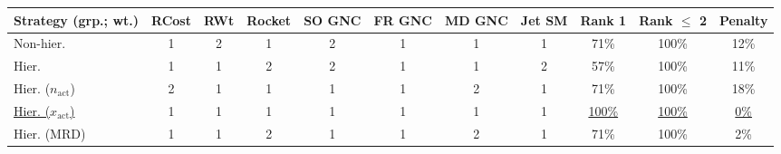\begin{tabular}{lcccccccccc}
\toprule
Strategy (grp.; wt.) & RCost & RWt & Rocket & SO GNC & FR GNC & MD GNC & Jet SM & Rank 1 & Rank $\leq$ 2 & Penalty \\
\midrule
Non-hier. & {\cellcolor[HTML]{00441B}} \color[HTML]{F1F1F1} 1 & {\cellcolor[HTML]{F7FCF5}} \color[HTML]{000000} 2 & {\cellcolor[HTML]{00441B}} \color[HTML]{F1F1F1} 1 & {\cellcolor[HTML]{F7FCF5}} \color[HTML]{000000} 2 & {\cellcolor[HTML]{00441B}} \color[HTML]{F1F1F1} 1 & {\cellcolor[HTML]{00441B}} \color[HTML]{F1F1F1} 1 & {\cellcolor[HTML]{00441B}} \color[HTML]{F1F1F1} 1 & {\cellcolor[HTML]{2B7BBA}} \color[HTML]{F1F1F1} 71\% & {\cellcolor[HTML]{08306B}} \color[HTML]{F1F1F1} 100\% & {\cellcolor[HTML]{94D390}} \color[HTML]{000000} 12\% \\
Hier. & {\cellcolor[HTML]{00441B}} \color[HTML]{F1F1F1} 1 & {\cellcolor[HTML]{00441B}} \color[HTML]{F1F1F1} 1 & {\cellcolor[HTML]{F7FCF5}} \color[HTML]{000000} 2 & {\cellcolor[HTML]{F7FCF5}} \color[HTML]{000000} 2 & {\cellcolor[HTML]{00441B}} \color[HTML]{F1F1F1} 1 & {\cellcolor[HTML]{00441B}} \color[HTML]{F1F1F1} 1 & {\cellcolor[HTML]{F7FCF5}} \color[HTML]{000000} 2 & {\cellcolor[HTML]{539ECD}} \color[HTML]{F1F1F1} 57\% & {\cellcolor[HTML]{08306B}} \color[HTML]{F1F1F1} 100\% & {\cellcolor[HTML]{86CC85}} \color[HTML]{000000} 11\% \\
Hier. ($n_{\mathrm{act}}$) & {\cellcolor[HTML]{F7FCF5}} \color[HTML]{000000} 2 & {\cellcolor[HTML]{00441B}} \color[HTML]{F1F1F1} 1 & {\cellcolor[HTML]{00441B}} \color[HTML]{F1F1F1} 1 & {\cellcolor[HTML]{00441B}} \color[HTML]{F1F1F1} 1 & {\cellcolor[HTML]{00441B}} \color[HTML]{F1F1F1} 1 & {\cellcolor[HTML]{F7FCF5}} \color[HTML]{000000} 2 & {\cellcolor[HTML]{00441B}} \color[HTML]{F1F1F1} 1 & {\cellcolor[HTML]{2B7BBA}} \color[HTML]{F1F1F1} 71\% & {\cellcolor[HTML]{08306B}} \color[HTML]{F1F1F1} 100\% & {\cellcolor[HTML]{E9F7E5}} \color[HTML]{000000} 18\% \\
\underline{Hier. ($x_{\mathrm{act}}$)} & {\cellcolor[HTML]{00441B}} \color[HTML]{F1F1F1} 1 & {\cellcolor[HTML]{00441B}} \color[HTML]{F1F1F1} 1 & {\cellcolor[HTML]{00441B}} \color[HTML]{F1F1F1} 1 & {\cellcolor[HTML]{00441B}} \color[HTML]{F1F1F1} 1 & {\cellcolor[HTML]{00441B}} \color[HTML]{F1F1F1} 1 & {\cellcolor[HTML]{00441B}} \color[HTML]{F1F1F1} 1 & {\cellcolor[HTML]{00441B}} \color[HTML]{F1F1F1} 1 & {\cellcolor[HTML]{08306B}} \color[HTML]{F1F1F1} \underline{100\%} & {\cellcolor[HTML]{08306B}} \color[HTML]{F1F1F1} \underline{100\%} & {\cellcolor[HTML]{00441B}} \color[HTML]{F1F1F1} \underline{0\%} \\
Hier. (MRD) & {\cellcolor[HTML]{00441B}} \color[HTML]{F1F1F1} 1 & {\cellcolor[HTML]{00441B}} \color[HTML]{F1F1F1} 1 & {\cellcolor[HTML]{F7FCF5}} \color[HTML]{000000} 2 & {\cellcolor[HTML]{00441B}} \color[HTML]{F1F1F1} 1 & {\cellcolor[HTML]{00441B}} \color[HTML]{F1F1F1} 1 & {\cellcolor[HTML]{F7FCF5}} \color[HTML]{000000} 2 & {\cellcolor[HTML]{00441B}} \color[HTML]{F1F1F1} 1 & {\cellcolor[HTML]{2B7BBA}} \color[HTML]{F1F1F1} 71\% & {\cellcolor[HTML]{08306B}} \color[HTML]{F1F1F1} 100\% & {\cellcolor[HTML]{006328}} \color[HTML]{F1F1F1} 2\% \\
\bottomrule
\end{tabular}
